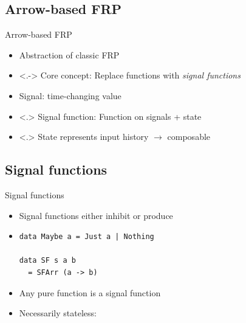 \documentclass{beamer}
\begin{document}
    \subsection{Arrow-based FRP}
    \begin{frame}{Arrow-based FRP}
    \begin{itemize}
    \item<+-> Abstraction of classic FRP
    \item<.-> Core concept: Replace functions with \emph{signal functions}
    \item<+-> Signal: time-changing value
    \item<.> Signal function: Function on signals + state
    \begin{figure}[ht]
\centering
{}
\end{figure}
    \item<.> State represents input history $\rightarrow$ composable
    \end{itemize}
    \end{frame}
    
    \subsection{Signal functions}
\begin{frame}[fragile]{Signal functions}
        \begin{itemize}
        \item Signal functions either inhibit or produce
        \item 
\begin{verbatim}
data Maybe a = Just a | Nothing

data SF s a b 
  = SFArr (a -> b)
\end{verbatim} 
    \item Any pure function is a signal function
    \item Necessarily stateless: 
    \end{itemize}
\end{frame}
\end{document}
